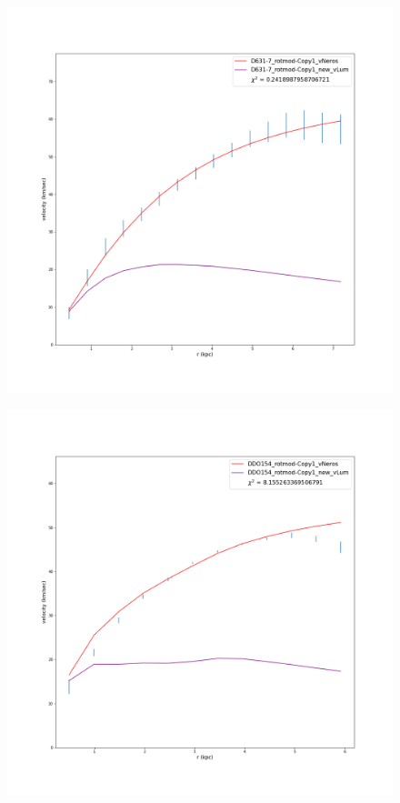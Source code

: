 \documentclass[reprint,%
 amsmath,amssymb,
 aps,
]{revtex4-1}
\begin{document}
\begin{figure}
\begin{minipage}{.5\textwidth}
  \label{fig:test2}
\end{minipage}
\begin{minipage}{.5\textwidth}
  \centering
  \includegraphics[width=.95\linewidth]{Updated_Graphs_withnewcolorsandfonts/D631-7_rotmod-Copy1_XueSofue.png}
  \label{fig:test1}
\end{minipage}%
\begin{minipage}{.5\textwidth}
  \centering
  \includegraphics[width=.95\linewidth]{Updated_Graphs_withnewcolorsandfonts/DDO154_rotmod-Copy1_XueSofue.png}

\end{minipage}
\end{figure}
\end{document}
